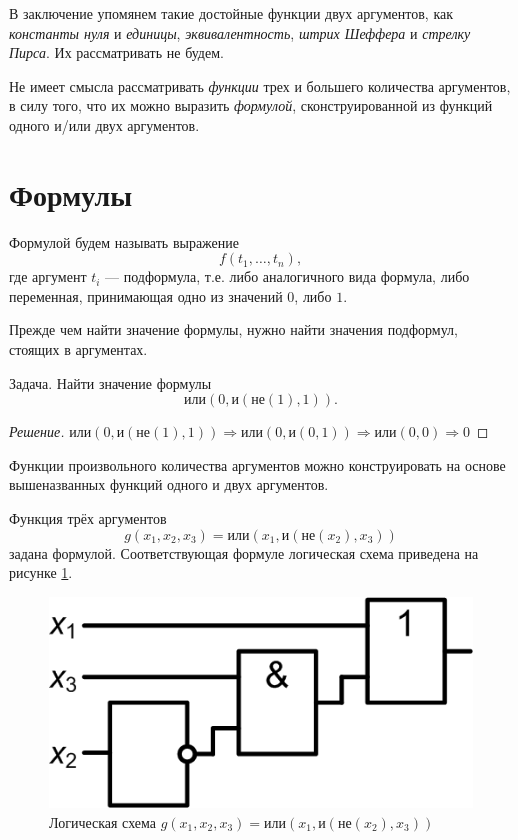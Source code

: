 В заключение упомянем такие достойные функции двух аргументов, как \emph{константы нуля} и \emph{единицы}, \emph{эквивалентность}, \emph{штрих Шеффера} и \emph{стрелку Пирса}. Их рассматривать не будем. 

Не имеет смысла рассматривать \emph{функции} трех и большего количества аргументов, в силу того, что их можно выразить \emph{формулой}, сконструированной из функций одного и/или двух аргументов.


\section{Формулы}

Формулой будем называть выражение 
\begin{equation}
    \label{eq:ch:alog:binform}
    f(t_1,\ldots,t_n),
\end{equation}
где аргумент $t_i$ --- подформула, т.е. либо аналогичного вида формула, либо переменная, принимающая одно из значений $0$, либо $1$.

Прежде чем найти значение формулы, нужно найти значения подформул, стоящих в аргументах.

\begin{exampl} Задача. Найти значение формулы 
\[
    \textit{или}(0,\textit{и}(\textit{не}(1), 1)).
\]
\end{exampl}
\begin{proof}[Решение] 
\(
    \textit{или}(0,\textit{и}(\textit{не}(1), 1))\Rightarrow
    \textit{или}(0,\textit{и}(0, 1))\Rightarrow
    \textit{или}(0,0)\Rightarrow 0
\)
\end{proof}

Функции произвольного количества аргументов можно конструировать на основе вышеназванных функций одного и двух аргументов. 
    \begin{exampl}\label{ex:ch:alog:f3arg} Функция трёх аргументов 
    \[
        g(x_1,x_2,x_3)=\textit{или}(x_1,\textit{и}(\textit{не}(x_2), x_3))
    \]
    задана формулой. Соответствующая формуле логическая схема приведена на рисунке \ref{fig::alog:formulae}.
\end{exampl}

\begin{figure}[!ht]
    \centering
    \includegraphics[width=.42\textwidth]{fig/formulae}
    \caption{Логическая схема $g(x_1,x_2,x_3)=\textit{или}(x_1,\textit{и}(\textit{не}(x_2), x_3))$}
    \label{fig::alog:formulae}
\end{figure} 

